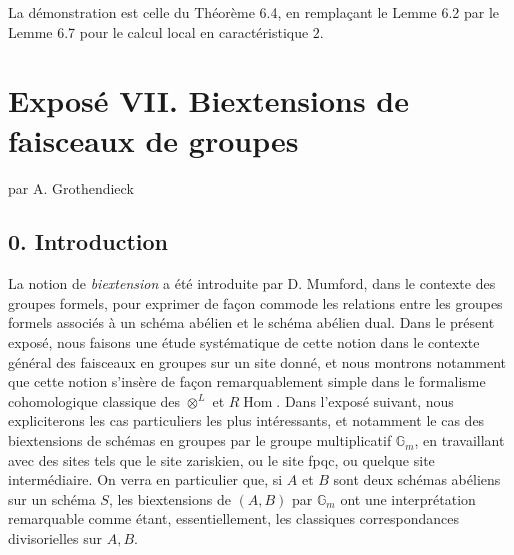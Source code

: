 \documentclass[11pt]{article}
\providecommand{\Gm}{\mathbb G_m}
\providecommand{\pr}{\operatorname{pr}}
\providecommand{\Ens}{\mathrm{Ens}}
\providecommand{\id}{\operatorname{id}}
\begin{document}
La démonstration est celle du Théorème 6.4, en remplaçant le Lemme 6.2 par le Lemme 6.7 pour le calcul local en caractéristique \(2\).



\providecommand{\cU}{\mathcal U}
\providecommand{\T}{\mathcal T}
\providecommand{\e}{\mathrm e}
\providecommand{\Ens}{\operatorname{Ens}}
\providecommand{\Alg}{\operatorname{Alg}}
\providecommand{\Homens}{\operatorname{Hom}_{\mathrm{ens}}}
\providecommand{\Homalg}{\operatorname{Hom}_{\mathrm{alg}}}
\providecommand{\Hompt}{\operatorname{Hom}_{\mathrm{pt}}}
\providecommand{\EXT}{\operatorname{EXT}}
\providecommand{\TORS}{\operatorname{TORS}}
\providecommand{\BITORSRIG}{\operatorname{BITORSRIG}}
\providecommand{\BITORSBIRIG}{\operatorname{BITORSBIRIG}}
\providecommand{\BITORS}{\operatorname{BITORS}}
\providecommand{\pr}{\operatorname{pr}}
\providecommand{\id}{\mathrm{id}}
\providecommand{\sym}{\mathrm{sym}}
\providecommand{\h}{\mathrm h}
\providecommand{\cA}{\mathcal A}
\providecommand{\cB}{\mathcal B}


\section*{Exposé VII. Biextensions de faisceaux de groupes}
\begin{center}
par A. Grothendieck
\end{center}

\subsection*{0. Introduction}

La notion de \emph{biextension} a été introduite par D. Mumford, dans le contexte des groupes formels, pour exprimer de façon commode les relations entre les groupes formels associés à un schéma abélien et le schéma abélien dual.  Dans le présent exposé, nous faisons une étude systématique de cette notion dans le contexte général des faisceaux en groupes sur un site donné, et nous montrons notamment que cette notion s'insère de façon remarquablement simple dans le formalisme cohomologique classique des \(\otimes^{L}\) et \(R\!\operatorname{Hom}\).  Dans l'exposé suivant, nous expliciterons les cas particuliers les plus intéressants, et notamment le cas des biextensions de schémas en groupes par le groupe multiplicatif \(\Gm\), en travaillant avec des sites tels que le site zariskien, ou le site fpqc, ou quelque site intermédiaire.  On verra en particulier que, si \(A\) et \(B\) sont deux schémas abéliens sur un schéma \(S\), les biextensions de \((A,B)\) par \(\Gm\) ont une interprétation remarquable comme étant, essentiellement, les classiques correspondances divisorielles sur \(A,B\).
\end{document}
